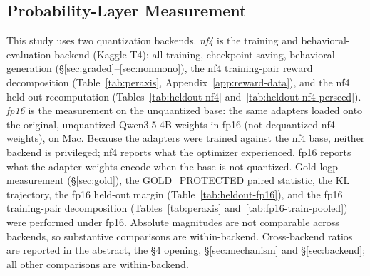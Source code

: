 \documentclass{article}
\begin{document}
\subsection{Probability-Layer Measurement}
This study uses two quantization backends. \emph{nf4} is the training and behavioral-evaluation backend (Kaggle T4): all training, checkpoint saving, behavioral generation (\S\ref{sec:graded}--\ref{sec:nonmono}), the nf4 training-pair reward decomposition (Table~\ref{tab:peraxis}, Appendix~\ref{app:reward-data}), and the nf4 held-out recomputation (Tables~\ref{tab:heldout-nf4} and~\ref{tab:heldout-nf4-perseed}). \emph{fp16} is the measurement on the unquantized base: the same adapters loaded onto the original, unquantized Qwen3.5-4B weights in fp16 (not dequantized nf4 weights), on Mac. Because the adapters were trained against the nf4 base, neither backend is privileged; nf4 reports what the optimizer experienced, fp16 reports what the adapter weights encode when the base is not quantized. Gold-logp measurement (\S\ref{sec:gold}), the GOLD\_PROTECTED paired statistic, the KL trajectory, the fp16 held-out margin (Table~\ref{tab:heldout-fp16}), and the fp16 training-pair decomposition (Tables~\ref{tab:peraxis} and~\ref{tab:fp16-train-pooled}) were performed under fp16. Absolute magnitudes are not comparable across backends, so substantive comparisons are within-backend. Cross-backend ratios are reported in the abstract, the \S4 opening, \S\ref{sec:mechanism} and \S\ref{sec:backend}; all other comparisons are within-backend.
\end{document}
